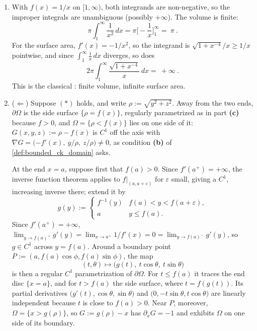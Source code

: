 \begin{exercisesolution}
\begin{enumerate}[label=\textbf{(\alph*)}]
  \item With $f(x)=1/x$ on $[1,\infty)$, both integrands are non-negative, so the
    improper integrals are unambiguous (possibly $+\infty$). The volume is finite:
    \[\pi\int_1^\infty \frac{1}{x^2}\,dx = \pi\Big[-\frac1x\Big]_1^\infty = \boxed{\ \pi\ }.\]
    For the surface area, $f'(x) = -1/x^2$, so the integrand is $\sqrt{1+x^{-4}}/x \geq 1/x$
    pointwise, and since $\int_1^\infty \frac1x\,dx$ diverges, so does
    \[2\pi\int_1^\infty \frac{\sqrt{1+x^{-4}}}{x}\,dx = \boxed{\ +\infty\ }.\]
    This is the classical  : finite
    volume, infinite surface area.

  \item ($\Leftarrow$) Suppose $(*)$ holds, and write $\rho := \sqrt{y^2+z^2}$. Away from the two
    ends, $\partial\Omega$ is the side surface $\{\rho = f(x)\}$, regularly parametrized as in
    part \textbf{(c)} because $f > 0$, and $\Omega = \{\rho < f(x)\}$ lies on one side of it:
    $G(x,y,z) := \rho - f(x)$ is $C^1$ off the axis with
    $\nabla G = \big({-f'(x)},\ y/\rho,\ z/\rho\big) \neq 0$, as condition \textbf{(b)} of
    \cref{def:bounded_ck_domain} asks.

    At the end $x = a$, suppose first that $f(a) > 0$. Since $f'(a^+)=+\infty$, the inverse
    function theorem applies to $f|_{(a,a+\varepsilon)}$ for $\varepsilon$ small, giving a $C^1$,
    increasing inverse there; extend it by
    \[g(y) := \begin{cases} f^{-1}(y) & f(a)<y<f(a+\varepsilon), \\ a & y\leq f(a). \end{cases}\]
    Since $f'(a^+)=+\infty$, $\lim_{y\to f(a)^+}g'(y) = \lim_{x\to a^+} 1/f'(x) = 0 =
    \lim_{y\to f(a)^-}g'(y)$, so $g\in C^1$ across $y=f(a)$. Around a boundary point
    $P := (a,f(a)\cos\phi,f(a)\sin\phi)$, the map
    \[(t,\theta)\mapsto\big(g(t),\ t\cos\theta,\ t\sin\theta\big)\]
    is then a regular $C^1$ parametrization of $\partial\Omega$. For $t \leq f(a)$ it traces the
    end disc $\{x = a\}$, and for $t > f(a)$ the side surface, where $t = f(g(t))$. Its partial
    derivatives $\big(g'(t),\cos\theta,\sin\theta\big)$ and $\big(0,-t\sin\theta,t\cos\theta\big)$
    are linearly independent because $t$ is close to $f(a) > 0$. Near $P$, moreover,
    $\Omega = \{x > g(\rho)\}$, so $G := g(\rho) - x$ has $\partial_x G = -1$ and exhibits $\Omega$
    on one side of its boundary.


\end{enumerate}
\end{exercisesolution}
